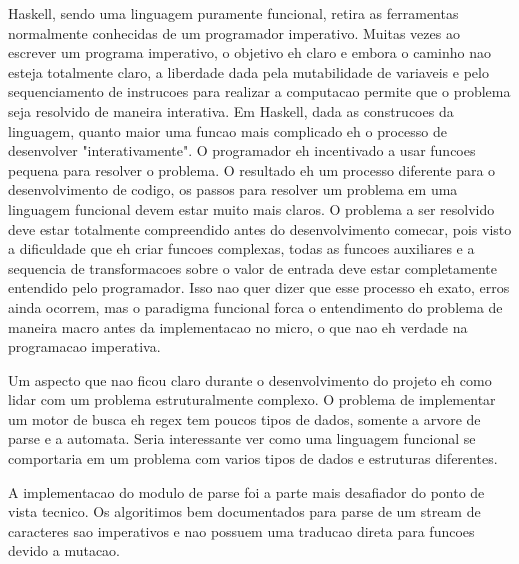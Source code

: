 Haskell, sendo uma linguagem puramente funcional, retira as ferramentas normalmente conhecidas de um programador imperativo.
Muitas vezes ao escrever um programa imperativo, o objetivo eh claro e embora o caminho nao esteja totalmente claro, a liberdade dada pela mutabilidade de variaveis e pelo sequenciamento de instrucoes para realizar a computacao permite que o problema seja resolvido de maneira interativa.
Em Haskell, dada as construcoes da linguagem, quanto maior uma funcao mais complicado eh o processo de desenvolver "interativamente".
O programador eh incentivado a usar funcoes pequena para resolver o problema.
O resultado eh um processo diferente para o desenvolvimento de codigo, os passos para resolver um problema em uma linguagem funcional devem estar muito mais claros.
O problema a ser resolvido deve estar totalmente compreendido antes do desenvolvimento comecar, pois visto a dificuldade que eh criar funcoes complexas, todas as funcoes auxiliares e a sequencia de transformacoes sobre o valor de entrada deve estar completamente entendido pelo programador.
Isso nao quer dizer que esse processo eh exato, erros ainda ocorrem, mas o paradigma funcional forca o entendimento do problema de maneira macro antes da implementacao no micro, o que nao eh verdade na programacao imperativa.

Um aspecto que nao ficou claro durante o desenvolvimento do projeto eh como lidar com um problema estruturalmente complexo.
O problema de implementar um motor de busca eh regex tem poucos tipos de dados, somente a arvore de parse e a automata.
Seria interessante ver como uma linguagem funcional se comportaria em um problema com varios tipos de dados e estruturas diferentes.

A implementacao do modulo de parse foi a parte mais desafiador do ponto de vista tecnico.
Os algoritimos bem documentados para parse de um stream de caracteres sao imperativos e nao possuem uma traducao direta para funcoes devido a mutacao.


